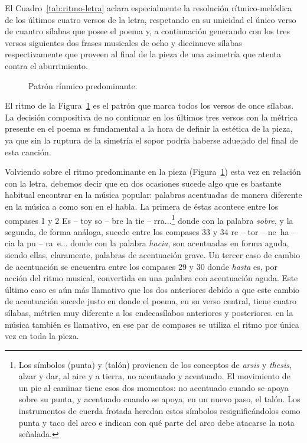 El Cuadro~\ref{tab:ritmo-letra} aclara especialmente la resolución rítmico-melódica de los últimos cuatro versos de la letra, respetando en su unicidad el único verso de cuantro sílabas que posee el poema y, a continuación generando con los tres versos siguientes dos frases musicales de ocho y diecinueve sílabas respectivamente que proveen al final de la pieza de una asimetría que atenta contra el aburrimiento.

\begin{figure}[H]
\centering
{}
\caption{Patrón rínmico predominante.}
\label{fig:patron-ritmico}
\end{figure}

El ritmo de la Figura~\ref{fig:patron-ritmico} es el patrón que marca todos los versos de once sílabas. La decisión compositiva de no continuar en los últimos tres versos con la métrica presente en el poema es fundamental a la hora de definir la estética de la pieza, ya que sin la ruptura de la simetría el sopor podría haberse adue;ado del final de esta canción.

Volviendo sobre el ritmo predominante en la pieza (Figura~\ref{fig:patron-ritmico}) esta vez en relación con la letra, debemos decir que en dos ocasiones sucede algo que es bastante habitual encontrar en la música popular: palabras acentuadas de manera diferente en la música a como son en el habla. La primera de éstas acontece entre los compases 1 y 2  {Es -- toy so -- bre la tie -- rra...}\footnote{Los símbolos  (punta) y  (talón) provienen de los conceptos de \emph{arsis} y \emph{thesis}, alzar y dar, al aire y a tierra, no acentuado y acentuado. El movimiento de un pie al caminar tiene esos dos momentos: no acentuado cuando se apoya sobre su punta, y acentuado cuando se apoya, en un nuevo paso, el talón. Los instrumentos de cuerda frotada heredan estos símbolos resignificándolos como punta y taco del arco e indican con qué parte del arco debe atacarse la nota señalada.} donde con la palabra \emph{sobre}, y la segunda, de forma análoga, sucede entre los compases 33 y 34  {re -- tor -- ne~ha -- cia la pu -- ra~e...} donde con la palabra \emph{hacia}, son acentuadas en forma aguda, siendo ellas, claramente, palabras de acentuación grave. Un tercer caso de cambio de acentuación se encuentra entre los compases 29 y 30  donde \emph{hasta} es, por acción del ritmo musical, convertida en una palabra con acentuación aguda. Este último caso es aún más llamativo que los dos anteriores debido a que este cambio de acentuación sucede justo en donde el poema, en su verso central, tiene cuatro sílabas, métrica muy diferente a los endecasílabos anteriores y posteriores. en la música también es llamativo, en ese par de compases se utiliza el ritmo  por única vez en toda la pieza.
